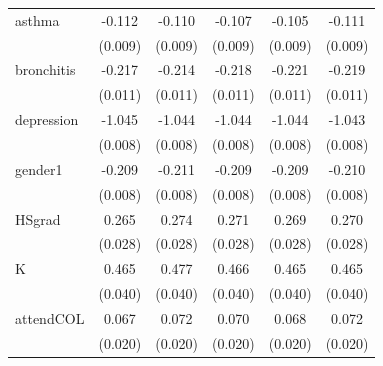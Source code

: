 \documentclass[11pt,a4paper,oldfontcommands]{memoir}
\begin{document}
{\begin{footnotesize}
\begin{tiny}
\begin{longtable}{l*{5}{c}}
asthma              &      -0.112\sym{***}&      -0.110\sym{***}&      -0.107\sym{***}&      -0.105\sym{***}&      -0.111\sym{***}\\
                    &     (0.009)         &     (0.009)         &     (0.009)         &     (0.009)         &     (0.009)         \\
 
bronchitis          &      -0.217\sym{***}&      -0.214\sym{***}&      -0.218\sym{***}&      -0.221\sym{***}&      -0.219\sym{***}\\
                    &     (0.011)         &     (0.011)         &     (0.011)         &     (0.011)         &     (0.011)         \\
 
depression          &      -1.045\sym{***}&      -1.044\sym{***}&      -1.044\sym{***}&      -1.044\sym{***}&      -1.043\sym{***}\\
                    &     (0.008)         &     (0.008)         &     (0.008)         &     (0.008)         &     (0.008)         \\
 
gender1             &      -0.209\sym{***}&      -0.211\sym{***}&      -0.209\sym{***}&      -0.209\sym{***}&      -0.210\sym{***}\\
                    &     (0.008)         &     (0.008)         &     (0.008)         &     (0.008)         &     (0.008)         \\
 
HSgrad              &       0.265\sym{***}&       0.274\sym{***}&       0.271\sym{***}&       0.269\sym{***}&       0.270\sym{***}\\
                    &     (0.028)         &     (0.028)         &     (0.028)         &     (0.028)         &     (0.028)         \\
 
K                   &       0.465\sym{***}&       0.477\sym{***}&       0.466\sym{***}&       0.465\sym{***}&       0.465\sym{***}\\
                    &     (0.040)         &     (0.040)         &     (0.040)         &     (0.040)         &     (0.040)         \\
 
attendCOL           &       0.067\sym{***}&       0.072\sym{***}&       0.070\sym{***}&       0.068\sym{***}&       0.072\sym{***}\\
                    &     (0.020)         &     (0.020)         &     (0.020)         &     (0.020)         &     (0.020)         \\
 

\end{longtable}
\end{tiny}
\end{footnotesize}}
\end{document}
